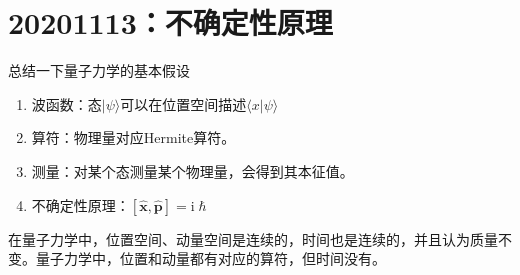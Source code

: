     \section{20201113：不确定性原理}
        总结一下量子力学的基本假设
        \begin{enumerate}
            \item 波函数：态$|\psi \rangle$可以在位置空间描述$\langle x|\psi\rangle$
            \item 算符：物理量对应Hermite算符。
            \item 测量：对某个态测量某个物理量，会得到其本征值。
            \item 不确定性原理：$[\hat{\bm{x}},\hat{\bm{p}}] = \mathrm{i}\hslash$
        \end{enumerate}
        在量子力学中，位置空间、动量空间是连续的，时间也是连续的，并且认为质量不变。量子力学中，位置和动量都有对应的算符，但时间没有。

